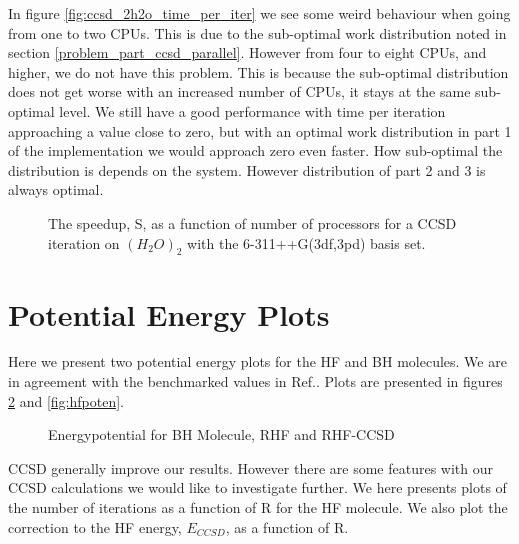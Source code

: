 In figure \ref{fig:ccsd_2h2o_time_per_iter} we see some weird behaviour when going from one to two CPUs. This is due to the sub-optimal work distribution noted in section \ref{problem_part_ccsd_parallel}. However from four to eight CPUs, and higher, we do not have this problem. This is because the sub-optimal distribution does not get worse with an increased number of CPUs, it stays at the same sub-optimal level. We still have a good performance with time per iteration approaching a value close to zero, but with an optimal work distribution in part 1 of the implementation we would approach zero even faster. How sub-optimal the distribution is depends on the system. However distribution of part 2 and 3 is always optimal. 

\newpage


\begin{figure}[h!]
\begin{center}
\caption{The speedup, S, as a function of number of processors for a CCSD iteration on $(H_2O)_2$ with the 6-311++G(3df,3pd) basis set.}
\label{fig:ccsd_2h2o_time_speedup}
\end{center}
\end{figure}

\newpage

\section{Potential Energy Plots}
Here we present two potential energy plots for the HF and BH molecules. We are in agreement with the benchmarked values in  Ref.\cite{potential_energy_citation_plots}. Plots are presented in figures \ref{fig:bhpoten} and \ref{fig:hfpoten}. \\

\begin{figure}[h!]
\begin{center}
\caption{Energypotential for BH Molecule, RHF and RHF-CCSD}
\label{fig:bhpoten}
\end{center}
\end{figure}

CCSD generally improve our results. However there are some features with our CCSD calculations we would like to investigate further. We here presents plots of the number of iterations as a function of R for the HF molecule. We also plot the correction to the HF energy, $E_{CCSD}$, as a function of R. \\ 


